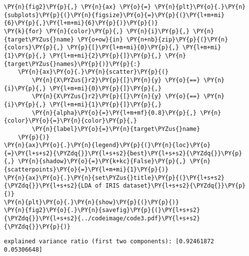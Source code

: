 \begin{Verbatim}[commandchars=\\\{\}]
\PY{n}{fig2}\PY{p}{,} \PY{n}{ax} \PY{o}{=} \PY{n}{plt}\PY{o}{.}\PY{n}{subplots}\PY{p}{(}\PY{n}{figsize}\PY{o}{=}\PY{p}{(}\PY{l+m+mi}{6}\PY{p}{,}\PY{l+m+mi}{6}\PY{p}{)}\PY{p}{)}
\PY{k}{for} \PY{n}{color}\PY{p}{,} \PY{n}{i}\PY{p}{,} \PY{n}{target\PYZus{}name} \PY{o+ow}{in} \PY{n+nb}{zip}\PY{p}{(}\PY{n}{colors}\PY{p}{,} \PY{p}{[}\PY{l+m+mi}{0}\PY{p}{,} \PY{l+m+mi}{1}\PY{p}{,} \PY{l+m+mi}{2}\PY{p}{]}\PY{p}{,} \PY{n}{target\PYZus{}names}\PY{p}{)}\PY{p}{:}
    \PY{n}{ax}\PY{o}{.}\PY{n}{scatter}\PY{p}{(}
        \PY{n}{X\PYZus{}r2}\PY{p}{[}\PY{n}{y} \PY{o}{==} \PY{n}{i}\PY{p}{,} \PY{l+m+mi}{0}\PY{p}{]}\PY{p}{,} 
        \PY{n}{X\PYZus{}r2}\PY{p}{[}\PY{n}{y} \PY{o}{==} \PY{n}{i}\PY{p}{,} \PY{l+m+mi}{1}\PY{p}{]}\PY{p}{,} 
        \PY{n}{alpha}\PY{o}{=}\PY{l+m+mf}{0.8}\PY{p}{,} \PY{n}{color}\PY{o}{=}\PY{n}{color}\PY{p}{,} 
        \PY{n}{label}\PY{o}{=}\PY{n}{target\PYZus{}name}
    \PY{p}{)}
\PY{n}{ax}\PY{o}{.}\PY{n}{legend}\PY{p}{(}\PY{n}{loc}\PY{o}{=}\PY{l+s+s2}{\PYZdq{}}\PY{l+s+s2}{best}\PY{l+s+s2}{\PYZdq{}}\PY{p}{,} \PY{n}{shadow}\PY{o}{=}\PY{k+kc}{False}\PY{p}{,} \PY{n}{scatterpoints}\PY{o}{=}\PY{l+m+mi}{1}\PY{p}{)}
\PY{n}{ax}\PY{o}{.}\PY{n}{set\PYZus{}title}\PY{p}{(}\PY{l+s+s2}{\PYZdq{}}\PY{l+s+s2}{LDA of IRIS dataset}\PY{l+s+s2}{\PYZdq{}}\PY{p}{)}
\PY{n}{plt}\PY{o}{.}\PY{n}{show}\PY{p}{(}\PY{p}{)}
\PY{n}{fig2}\PY{o}{.}\PY{n}{savefig}\PY{p}{(}\PY{l+s+s2}{\PYZdq{}}\PY{l+s+s2}{../codeimage/code3.pdf}\PY{l+s+s2}{\PYZdq{}}\PY{p}{)}
\end{Verbatim}

\begin{Verbatim}[commandchars=\\\{\}]
explained variance ratio (first two components): [0.92461872 0.05306648]
\end{Verbatim}